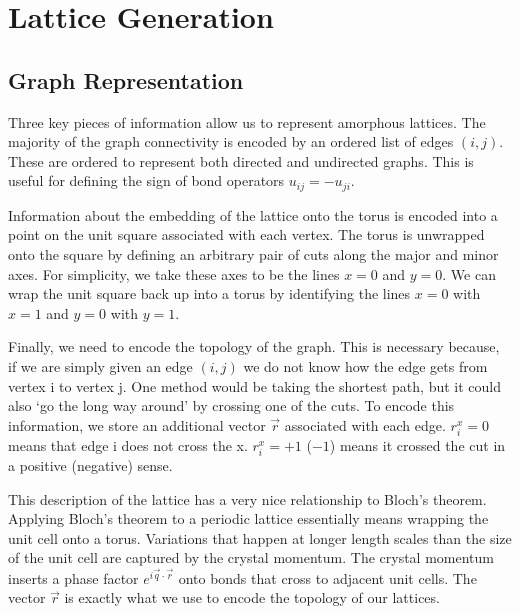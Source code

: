 \hypertarget{app-lattice-generation}{%
\section{Lattice Generation}\label{app-lattice-generation}}

\hypertarget{graph-representation}{%
\subsection{Graph Representation}\label{graph-representation}}

Three key pieces of information allow us to represent amorphous lattices. The majority of the graph connectivity is encoded by an ordered list of edges \((i,j)\). These are ordered to represent both directed and undirected graphs. This is useful for defining the sign of bond operators \(u_{ij} = - u_{ji}\).

Information about the embedding of the lattice onto the torus is encoded into a point on the unit square associated with each vertex. The torus is unwrapped onto the square by defining an arbitrary pair of cuts along the major and minor axes. For simplicity, we take these axes to be the lines \(x = 0\) and \(y = 0\). We can wrap the unit square back up into a torus by identifying the lines \(x = 0\) with \(x = 1\) and \(y = 0\) with \(y = 1\).

Finally, we need to encode the topology of the graph. This is necessary because, if we are simply given an edge \((i, j)\) we do not know how the edge gets from vertex i to vertex j. One method would be taking the shortest path, but it could also `go the long way around' by crossing one of the cuts. To encode this information, we store an additional vector \(\vec{r}\) associated with each edge. \(r_i^x = 0\) means that edge i does not cross the x. \(r_i^x = +1\) (\(-1\)) means it crossed the cut in a positive (negative) sense.

This description of the lattice has a very nice relationship to Bloch's theorem. Applying Bloch's theorem to a periodic lattice essentially means wrapping the unit cell onto a torus. Variations that happen at longer length scales than the size of the unit cell are captured by the crystal momentum. The crystal momentum inserts a phase factor \(e^{i \vec{q}\cdot\vec{r}}\) onto bonds that cross to adjacent unit cells. The vector \(\vec{r}\) is exactly what we use to encode the topology of our lattices.

